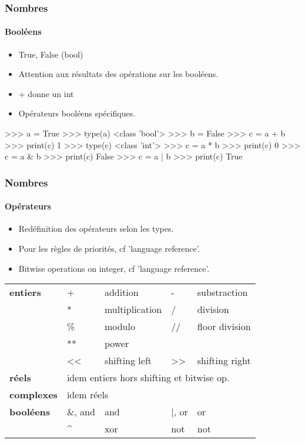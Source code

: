 \begin{frame}[fragile]
\frametitle{Nombres}
\framesubtitle{Booléens}
\begin{itemize}
 \item True, False (bool)
 \item Attention aux résultats des opérations sur les booléens.
 \item + donne un int
 \item Opérateurs booléens spécifiques.   
\end{itemize}
\begin{pythonConsole}
>>> a = True
>>> type(a)
<class 'bool'>
>>> b = False
>>> c = a + b
>>> print(c)
1
>>> type(c)
<class 'int'>
>>> c = a * b
>>> print(c)
0
>>> c = a & b  
>>> print(c)
False
>>> c = a | b
>>> print(c)
True
\end{pythonConsole}
\end{frame}
\begin{frame}
\frametitle{Nombres}
\framesubtitle{Opérateurs}
\begin{itemize}
 \item Redéfinition des opérateurs selon les types. 
 \item Pour les règles de priorités, cf 'language reference'.
 \item Bitwise operations on integer, cf 'language reference'. 
\end{itemize}

\begin{tabular}{l|ll|ll}
{\bfseries entiers} & + & addition & - & substraction \\
 &  * & multiplication & / & division \\
 & \% & modulo & // & floor division \\
 & ** & power  & & \\
 & << & shifting left & >> & shifting right \\
{\bfseries réels} & \multicolumn{4}{l}{idem entiers hors shifting et bitwise op.}\\
{\bfseries complexes} & \multicolumn{4}{l}{idem réels}\\
{\bfseries booléens} & \&, and & and & |, or & or \\
 & \^\/ & xor & not & not 
\end{tabular}
\end{frame}
